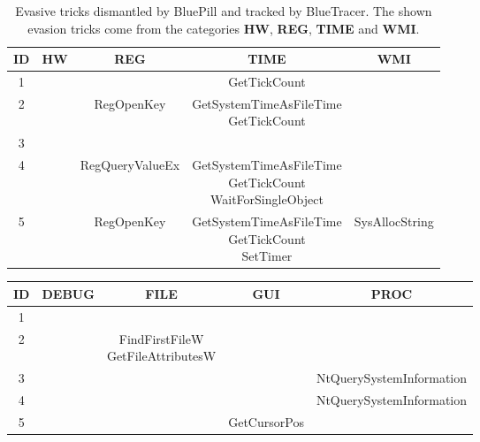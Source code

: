 \begin{table}[htp]
\begin{center}
\renewcommand{\arraystretch}{1.9}
 \begin{tabular}{|c|c|c|c|c|} 
 \hline
 \textbf{ID} & \textbf{HW} & \textbf{REG} & \textbf{TIME} & \textbf{WMI} \\ [0.5ex] 
 \hline\hline
 1 &  &  & GetTickCount & \\ 
 \hline
 2 &  & RegOpenKey & \makecell{GetSystemTimeAsFileTime\\GetTickCount} & \\
 \hline
 3 &  &  &  & \\
 \hline
 4 &  & RegQueryValueEx  & \makecell{GetSystemTimeAsFileTime\\GetTickCount\\WaitForSingleObject} & \\
 \hline
 5 &  & RegOpenKey & \makecell{GetSystemTimeAsFileTime\\GetTickCount\\SetTimer}      
& SysAllocString\\ [1ex] 
 \hline
\end{tabular}
\end{center}
\caption{Evasive tricks dismantled by BluePill and tracked by BlueTracer. The shown evasion tricks come from the categories \textbf{HW}, \textbf{REG}, \textbf{TIME} and \textbf{WMI}.}
\end{table}


\iffalse
\centering
\renewcommand{\arraystretch}{2}
\begin{tabularx}{\linewidth}{|c|c|c|c|c|}

\hline
\hline
   \textbf{ID} & \textbf{DEBUG} & \textbf{FILE} & \textbf{GUI} & \textbf{PROC} \\
\hline
1     & & & &  \\
\hline 
2       &  & \makecell{FindFirstFileW\\GetFileAttributesW} & &   \\
\hline
3       &  &  &  & NtQuerySystemInformation  \\
\hline
4      &  &  &  & NtQuerySystemInformation   \\
\hline
5      &  &  & GetCursorPos &     \\
\hline
\end{tabularx}
\vspace{0.2cm}

